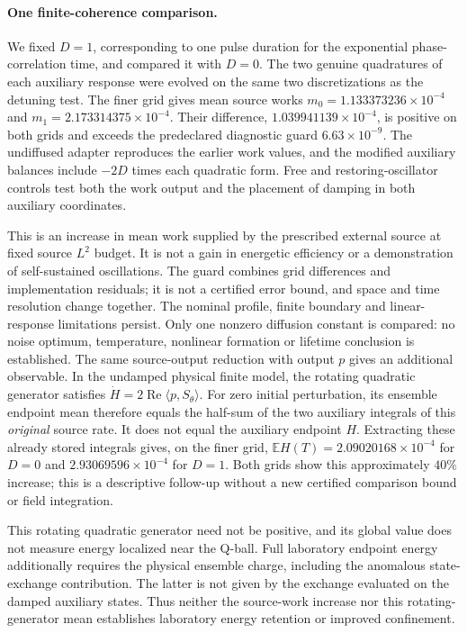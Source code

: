 \paragraph{One finite-coherence comparison.}
We fixed $D=1$, corresponding to one pulse duration for the exponential
phase-correlation time, and compared it with $D=0$. The two genuine
quadratures of each auxiliary response were evolved on the same two
discretizations as the detuning test. The finer grid gives mean source
works $m_0=1.133373236\times10^{-4}$ and
$m_1=2.173314375\times10^{-4}$. Their difference,
$1.039941139\times10^{-4}$, is positive on both grids and exceeds the
predeclared diagnostic guard $6.63\times10^{-9}$. The undiffused adapter
reproduces the earlier work values, and the modified auxiliary balances
include $-2D$ times each quadratic form. Free and restoring-oscillator
controls test both the work output and the placement of damping in both
auxiliary coordinates.

This is an increase in mean work supplied by the prescribed external
source at fixed source $L^2$ budget. It is not a gain in energetic efficiency
or a demonstration of self-sustained oscillations. The guard combines
grid differences and implementation residuals; it is not a certified
error bound, and space and time resolution change together. The nominal
profile, finite boundary and linear-response limitations persist. Only
one nonzero diffusion constant is compared: no noise optimum, temperature,
nonlinear formation or lifetime conclusion is established.
The same source-output reduction with output $p$ gives an additional
observable. In the undamped physical finite model, the rotating quadratic
generator satisfies $\dot H=2\operatorname{Re}\langle p,S_\theta\rangle$.
For zero initial perturbation, its ensemble endpoint mean therefore equals
the half-sum of the two auxiliary integrals of this \emph{original} source
rate. It does not equal the auxiliary endpoint $H$. Extracting these
already stored integrals gives, on the finer grid,
$\mathbb E H(T)=2.09020168\times10^{-4}$ for $D=0$ and
$2.93069596\times10^{-4}$ for $D=1$. Both grids show this approximately
$40\%$ increase; this is a descriptive follow-up without a new certified
comparison bound or field integration.

This rotating quadratic generator need not be positive, and its global
value does not measure energy localized near the Q-ball. Full laboratory
endpoint energy additionally requires the physical ensemble charge,
including the anomalous state-exchange contribution. The latter is not
given by the exchange evaluated on the damped auxiliary states. Thus
neither the source-work increase nor this rotating-generator mean establishes
laboratory energy retention or improved confinement.
